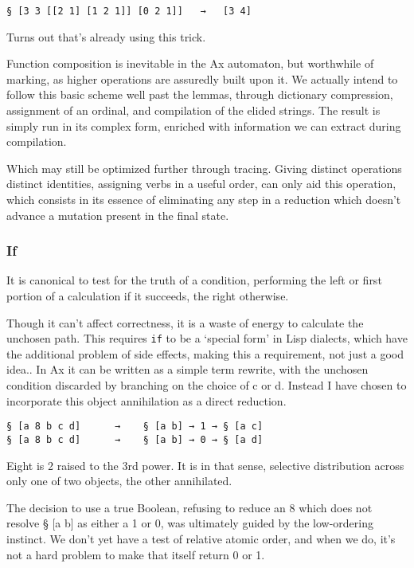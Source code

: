 \documentclass[twoside]{article}
\begin{document}
\begin{lstlisting}[style=listingblock]
§ [3 3 [[2 1] [1 2 1]] [0 2 1]]   →   [3 4]
\end{lstlisting}

Turns out that's already using this trick.

Function composition is inevitable in the Ax automaton, but worthwhile of marking, as higher operations are assuredly built upon it. We actually intend to follow this basic scheme well past the lemmas, through dictionary compression, assignment of an ordinal, and compilation of the elided strings. The result is simply run in its complex form, enriched with information we can extract during compilation.

Which may still be optimized further through tracing. Giving distinct operations distinct identities, assigning verbs in a useful order, can only aid this operation, which consists in its essence of eliminating any step in a reduction which doesn't advance a mutation present in the final state.

\subsubsection{If}

It is canonical to test for the truth of a condition, performing the left or first portion of a calculation if it succeeds, the right otherwise.

Though it can't affect correctness, it is a waste of energy to calculate the unchosen path. This requires \texttt{if} to be a `special form' in Lisp dialects, which have the additional problem of side effects, making this a requirement, not just a good idea.. In Ax it can be written as a simple term rewrite, with the unchosen condition discarded by branching on the choice of c or d.  Instead I have chosen to incorporate this object annihilation as a direct reduction.

\begin{lstlisting}[style=listingblock]
§ [a 8 b c d]      →    § [a b] → 1 → § [a c]
§ [a 8 b c d]      →    § [a b] → 0 → § [a d]
\end{lstlisting}

Eight is 2 raised to the 3rd power. It is in that sense, selective distribution across only one of two objects, the other annihilated.

The decision to use a true Boolean, refusing to reduce an 8 which does not resolve § [a b] as either a 1 or 0, was ultimately guided by the low-ordering instinct. We don't yet have a test of relative atomic order, and when we do, it's not a hard problem to make that itself return 0 or 1.
\end{document}
